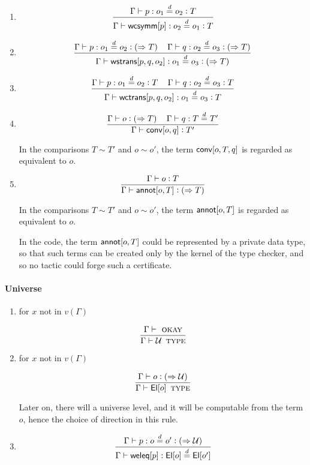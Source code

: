 \documentclass[11pt]{article}
\newcommand{\eqd}{\stackrel{d}{=}}
\newcommand{\Eu}{{\cal U}}
\newcommand{\spc}{{\,\,\,\,\,\,\,}}
\newcommand{\synth}[1]{\vcentcolon(\Rightarrow#1)} %
\newcommand{\ccheck}[1]{\vcentcolon#1}  %
\newcommand{\Type}{\mathop{\text{ \sc type}}}
\newcommand{\Okay}{\mathop{\text{ \sc okay}}}
\newcommand{\ha}[2]{#1[#2]}
\newcommand{\El}{{\sf El}}
\newcommand{\annot}{{\sf annot}}
\newcommand{\conv}{{\sf conv}}
\newcommand{\weleq}{{\sf weleq}}
\newcommand{\wcsymm}{{\sf wcsymm}}
\newcommand{\wstrans}{{\sf wstrans}}
\newcommand{\wctrans}{{\sf wctrans}}
\begin{document}
\begin{enumerate}
\item 
$$\frac{\Gamma\vdash p:o_1\eqd o_2 \ccheck{T}}{\Gamma\vdash \ha\wcsymm{p}:o_2\eqd o_1 \ccheck{T}}$$

\item 
$$\frac{\Gamma\vdash p:o_1\eqd o_2 \synth{T}\spc\Gamma\vdash q:o_2\eqd o_3 \synth{T}}{\Gamma\vdash \ha\wstrans{p,q,o_2}:o_1\eqd o_3 \synth{T}}$$

\item 
$$\frac{\Gamma\vdash p:o_1\eqd o_2 \ccheck{T}\spc\Gamma\vdash q:o_2\eqd o_3 \ccheck{T}}{\Gamma\vdash \ha\wctrans{p,q,o_2}:o_1\eqd o_3 \ccheck{T}}$$

\item 
$$\frac{\Gamma\vdash o \synth{T}\spc \Gamma\vdash q : T \eqd T'}{\Gamma\vdash \ha\conv{o,q} \ccheck{T'}}$$

In the comparisons $T\sim T'$ and $o\sim o'$, the term $\ha\conv{o,T,q}$ is regarded as equivalent to $o$.

\item 
$$\frac{\Gamma\vdash o \ccheck{T}}{\Gamma\vdash \ha\annot{o,T} \synth{T}}$$

In the comparisons $T\sim T'$ and $o\sim o'$, the term $\ha\annot{o,T}$ is regarded as equivalent to $o$.

In the code, the term $\ha\annot{o,T}$ could be represented by a private data
type, so that such terms can be created only by the kernel of the type checker,
and so no tactic could forge such a certificate.

\end{enumerate}

\paragraph{Universe}

\begin{enumerate}

\item for $x$ not in $v(\Gamma)$

$$\frac{\Gamma\vdash\Okay}{\Gamma \vdash \Eu\Type}$$

\item for $x$ not in $v(\Gamma)$

$$\frac{\Gamma\vdash o \synth{\Eu}}{\Gamma \vdash \ha\El{o}\Type}$$

Later on, there will a universe level, and it will be computable from the
term $o$, hence the choice of direction in this rule.

\item 

$$\frac{\Gamma\vdash p : o \eqd o' \synth{\Eu}}{\Gamma\vdash \ha\weleq{p} : \ha\El{o} \eqd \ha\El{o'}}$$

\end{enumerate}
\end{document}
